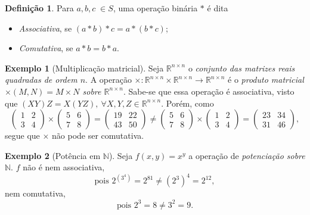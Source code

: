 \documentclass[a4paper,12pt]{article}
\theoremstyle{plain}
\theoremstyle{definition}
\newtheorem{definicao}{Definição}[section]
\newtheorem{exemplo}{Exemplo}[section]
\begin{document}
\begin{definicao}
	Para $a,b,c \; \in S$, uma operação binária $*$ é dita
	
	\begin{itemize}
		\item \emph{Associativa}, se $(a*b)*c = a*(b*c)$;
		\item \emph{Comutativa}, se \(a*b = b*a\).
	\end{itemize}
\end{definicao}

\begin{exemplo}[Multiplicação matricial]
	Seja $\mathbb{R}^{n\times n}$ o \emph{conjunto das matrizes reais quadradas de ordem $n$}. A operação $\times: \mathbb{R}^{n\times n}\times\mathbb{R}^{n\times n}\longrightarrow\mathbb{R}^{n\times n}$ é o \emph{produto matricial $\times(M,N) = M\times N$ sobre $\mathbb{R}^{n\times n}$}. Sabe-se que essa operação é associativa, visto que $(XY)Z = X(YZ), \ \forall X,Y,Z \in \mathbb{R}^{n\times n}$. Porém, como
	$$
	\begin{pmatrix}
		1&2\\
		3&4
	\end{pmatrix}
	\times
	\begin{pmatrix}
		5&6\\
		7&8
	\end{pmatrix}
	=
	\begin{pmatrix}
		19&22\\
		43&50
	\end{pmatrix}
	\neq
	\begin{pmatrix}
		5&6\\
		7&8
	\end{pmatrix}
	\times
	\begin{pmatrix}
		1&2\\
		3&4
	\end{pmatrix}
	=
	\begin{pmatrix}
		23&34\\
		31&46
	\end{pmatrix},
	$$
segue que $\times$ não pode ser comutativa.
\end{exemplo}

\begin{exemplo}[Potência em $\mathbb{N}$]
	Seja $f(x,y) = x^y$ a operação de \emph{potenciação sobre $\mathbb{N}$}. $f$ não é nem associativa, $$\text{pois }2^{(3^4)} = 2^{81} \neq (2^3)^4 = 2^{12},$$ nem comutativa, $$\text{pois }2^3 = 8 \neq 3^2 = 9.$$
\end{exemplo}
\end{document}
